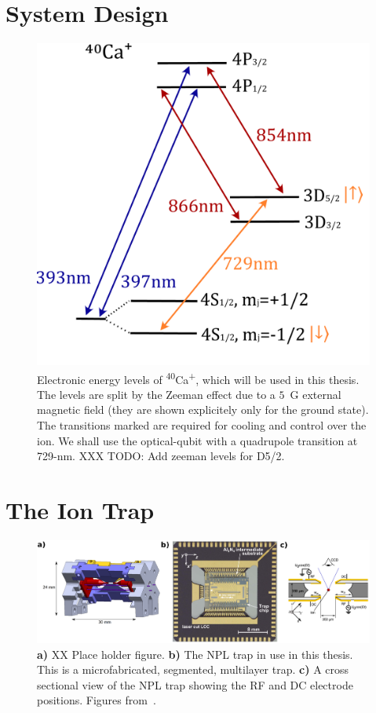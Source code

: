 \documentclass[12pt]{report}
\begin{document}
\section{System Design}
\label{sec:System Design}

    \begin{figure}[ht]
    \begin{center}
    \noindent\includegraphics[width=0.4\linewidth]{figures/pdf_figure/Ca40.pdf}
    \end{center}
    \caption{
    Electronic energy levels of \textsuperscript{40}Ca\textsuperscript{+},
    which will be used in this thesis. The levels are
    split by the Zeeman effect due to a $5$~G external magnetic field (they are shown explicitely only for the ground state). The
    transitions marked are required for cooling and control over the
    ion. We shall use the optical-qubit with a quadrupole transition at
    729-nm. XXX TODO: Add zeeman levels for D5/2.
    }

  \label{fig:ion}
\end{figure}

\section{The Ion Trap}
\label{sec:The Ion Trap}
    \begin{figure}
    \begin{center}
    \noindent\includegraphics[width=\linewidth]{figures/png_figure/trap_comp.png}
    \end{center}
    \caption{\textbf{a)} XX Place holder figure. \textbf{b)} The NPL trap in use in this thesis. This is a microfabricated,
    segmented, multilayer trap. \textbf{c)} A cross sectional view of
    the NPL trap showing the RF and DC electrode positions.  Figures
    from~\cite{choonee_silicon_2017}.
    \label{fig:trap}}
    \end{figure}
\end{document}
